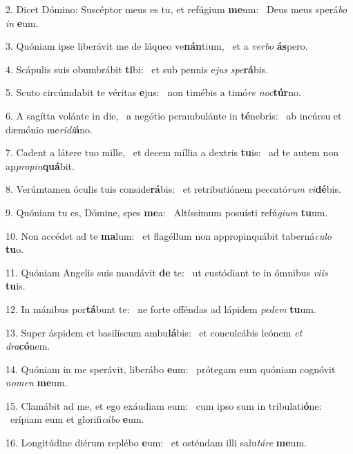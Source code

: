 2. Dicet Dómino: Suscéptor meus es tu, et refúgium \textbf{me}um: \ast\  Deus meus sperá\textit{bo} \textit{in} \textbf{e}um.\

3. Quóniam ipse liberávit me de láqueo ve\textbf{nán}tium, \ast\  et a \textit{ver}\textit{bo} \textbf{ás}pero.\

4. Scápulis suis obumbrábit \textbf{ti}bi: \ast\  et sub pennis e\textit{jus} \textit{spe}\textbf{rá}bis.\

5. Scuto circúmdabit te véritas \textbf{e}jus: \ast\  non timébis a timó\textit{re} \textit{noc}\textbf{túr}no.\

6. A sagítta volánte in die, \dag\  a negótio perambulánte in \textbf{té}nebris: \ast\  ab incúrsu et dæmónio me\textit{ri}\textit{di}\textbf{á}no.\

7. Cadent a látere tuo mille, \dag\  et decem míllia a dextris \textbf{tu}is: \ast\  ad te autem non ap\textit{pro}\textit{pin}\textbf{quá}bit.\

8. Verúmtamen óculis tuis conside\textbf{rá}bis: \ast\  et retributiónem peccató\textit{rum} \textit{vi}\textbf{dé}bis.\

9. Quóniam tu es, Dómine, spes \textbf{me}a: \ast\  Altíssimum posuísti refú\textit{gi}\textit{um} \textbf{tu}um.\

10. Non accédet ad te \textbf{ma}lum: \ast\  et flagéllum non appropinquábit taberná\textit{cu}\textit{lo} \textbf{tu}o.\

11. Quóniam Angelis suis mandávit \textbf{de} te: \ast\  ut custódiant te in ómnibus \textit{vi}\textit{is} \textbf{tu}is.\

12. In mánibus por\textbf{tá}bunt te: \ast\  ne forte offéndas ad lápidem \textit{pe}\textit{dem} \textbf{tu}um.\

13. Super áspidem et basilíscum ambu\textbf{lá}bis: \ast\  et conculcábis leónem \textit{et} \textit{dra}\textbf{có}nem.\

14. Quóniam in me sperávit, liberábo \textbf{e}um: \ast\  prótegam eum quóniam cognóvit \textit{no}\textit{men} \textbf{me}um.\

15. Clamábit ad me, et ego exáudiam eum: \dag\  cum ipso sum in tribulati\textbf{ó}ne: \ast\  erípiam eum et glorifi\textit{cá}\textit{bo} \textbf{e}um.\

16. Longitúdine diérum replébo \textbf{e}um: \ast\  et osténdam illi salu\textit{tá}\textit{re} \textbf{me}um.\

